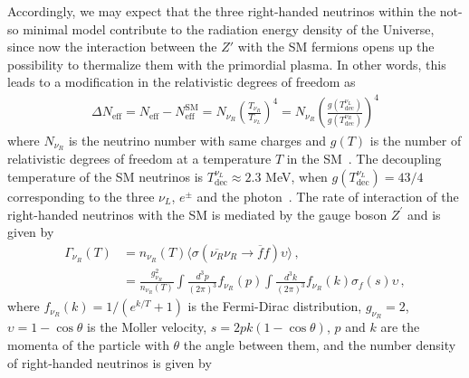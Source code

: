 \documentclass[12pt]{article}
\begin{document}

Accordingly, we may expect that 
the three right-handed neutrinos within the not-so minimal model
contribute to the radiation energy density of the Universe, since now   the interaction between the $Z'$ with the SM fermions  opens up the possibility to thermalize them with the primordial plasma.   
In other words, this leads to a modification in the relativistic degrees of freedom as~\cite{Anchordoqui:2012qu,Anchordoqui:2011nh}
%
\begin{align}
    \Delta N_{\text{eff}} = N_{\text{eff}} - N^{\text{SM}}_{\text{eff}} = N_{\nu_R} \left( \frac{T_{\nu_{R}}}{T_{\nu_{L}}} \right)^{4} = N_{\nu_R} \left( \frac{g(T^{\nu_{L}}_{\text{dec}})}{g(T^{\nu_{R}}_{\text{dec}})} \right)^{4}
\end{align}
%
where $N_{\nu_R}$ is the neutrino number with same charges and $g(T)$ is the number of relativistic degrees of freedom at a temperature $T$ in the SM~\cite{Aghanim:2018eyx}. The decoupling temperature of the SM neutrinos is $ T^{\nu_{L}}_{\text{dec}} \approx 2.3 $ MeV, when $g(T^{\nu_{L}}_{ \text{dec}}) = 43/4$ corresponding to the three $\nu_{L}$, $e^{\pm} $ and the photon~\cite{Kolb:1990vq,Enqvist:1991gx}. The rate of interaction of the right-handed neutrinos with the SM is mediated by the gauge boson $Z^{\prime} $ and is given by~\cite{SolagurenBeascoa:2012cz}
%
\begin{align}
    \Gamma_{\nu_R} (T) &= n_{\nu_R}(T) \langle \sigma(\overline{\nu_{R}} \nu_{R} \to \overline{f} f) \upsilon \rangle \,, \nonumber\\
    &= \frac{g^{2}_{\nu_R}}{n_{\nu_R}(T)} \int \frac{d^{3} p}{(2 \pi)^{3}} f_{\nu_R}(p) \int \frac{d^{3} k}{(2 \pi)^{3}} f_{\nu_R}(k) \sigma_{f}(s) \upsilon\,,
\end{align}
%
where $f_{\nu_R}(k)=1/(e^{k/T}+1)$ is the Fermi-Dirac distribution, $g_{\nu_R} = 2$, $\upsilon = 1-\cos{\theta}$ is the Moller velocity, $s = 2 p k (1-\cos{\theta})$, $p$ and $k$ are the momenta of the particle with $\theta$ the angle between them, and the number density of right-handed neutrinos is given by
\end{document}
